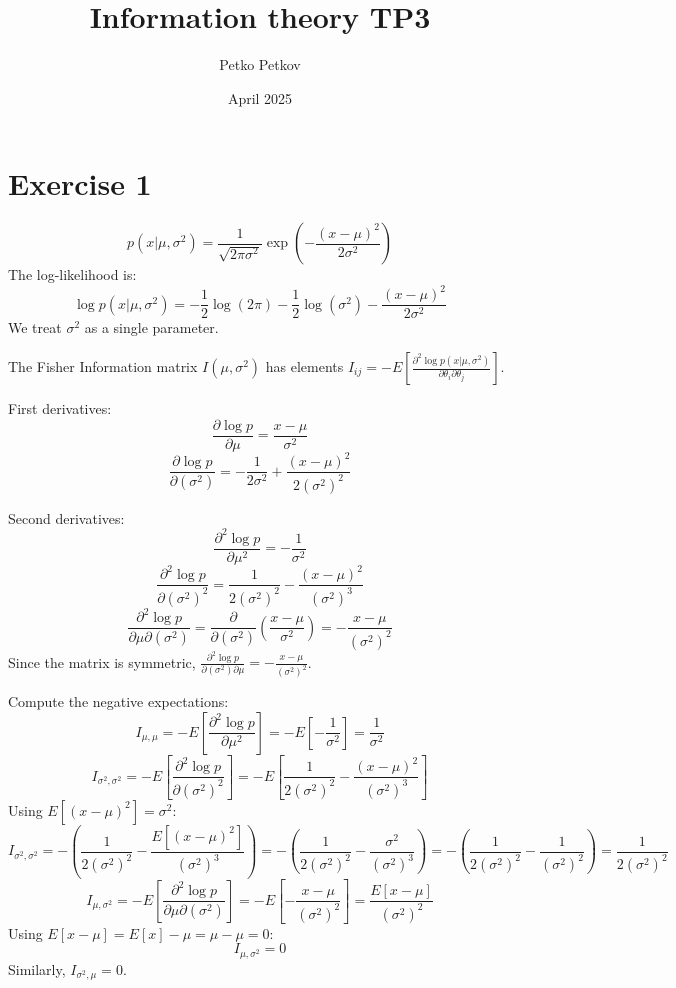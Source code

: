 \documentclass{article}
\title{Information theory TP3}
\author{Petko Petkov}
\begin{document}
\date{April 2025}
\maketitle

\section*{Exercise 1}

\[
p(x|\mu, \sigma^2) = \frac{1}{\sqrt{2\pi\sigma^2}} \exp\left(-\frac{(x-\mu)^2}{2\sigma^2}\right)
\]
The log-likelihood is:
\[
\log p(x|\mu, \sigma^2) = -\frac{1}{2} \log(2\pi) - \frac{1}{2} \log(\sigma^2) - \frac{(x-\mu)^2}{2\sigma^2}
\]
We treat $\sigma^2$ as a single parameter.

The Fisher Information matrix $I(\mu, \sigma^2)$ has elements $I_{ij} = -E\left[\frac{\partial^2 \log p(x|\mu, \sigma^2)}{\partial \theta_i \partial \theta_j}\right]$.

First derivatives:
\[
\frac{\partial \log p}{\partial \mu} = \frac{x-\mu}{\sigma^2}
\]
\[
\frac{\partial \log p}{\partial (\sigma^2)} = -\frac{1}{2\sigma^2} + \frac{(x-\mu)^2}{2(\sigma^2)^2}
\]

Second derivatives:
\[
\frac{\partial^2 \log p}{\partial \mu^2} = -\frac{1}{\sigma^2}
\]
\[
\frac{\partial^2 \log p}{\partial (\sigma^2)^2} = \frac{1}{2(\sigma^2)^2} - \frac{(x-\mu)^2}{(\sigma^2)^3}
\]
\[
\frac{\partial^2 \log p}{\partial \mu \partial (\sigma^2)} = \frac{\partial}{\partial (\sigma^2)} \left( \frac{x-\mu}{\sigma^2} \right) = -\frac{x-\mu}{(\sigma^2)^2}
\]
Since the matrix is symmetric, $\frac{\partial^2 \log p}{\partial (\sigma^2) \partial \mu} = -\frac{x-\mu}{(\sigma^2)^2}$.

Compute the negative expectations:
\[
I_{\mu, \mu} = -E\left[ \frac{\partial^2 \log p}{\partial \mu^2} \right] = -E\left[ -\frac{1}{\sigma^2} \right] = \frac{1}{\sigma^2}
\]
\[
I_{\sigma^2, \sigma^2} = -E\left[ \frac{\partial^2 \log p}{\partial (\sigma^2)^2} \right] = -E\left[ \frac{1}{2(\sigma^2)^2} - \frac{(x-\mu)^2}{(\sigma^2)^3} \right]
\]
Using $E[(x-\mu)^2] = \sigma^2$:
\[
I_{\sigma^2, \sigma^2} = -\left( \frac{1}{2(\sigma^2)^2} - \frac{E[(x-\mu)^2]}{(\sigma^2)^3} \right) = -\left( \frac{1}{2(\sigma^2)^2} - \frac{\sigma^2}{(\sigma^2)^3} \right) = -\left( \frac{1}{2(\sigma^2)^2} - \frac{1}{(\sigma^2)^2} \right) = \frac{1}{2(\sigma^2)^2}
\]
\[
I_{\mu, \sigma^2} = -E\left[ \frac{\partial^2 \log p}{\partial \mu \partial (\sigma^2)} \right] = -E\left[ -\frac{x-\mu}{(\sigma^2)^2} \right] = \frac{E[x-\mu]}{(\sigma^2)^2}
\]
Using $E[x-\mu] = E[x] - \mu = \mu - \mu = 0$:
\[
I_{\mu, \sigma^2} = 0
\]
Similarly, $I_{\sigma^2, \mu} = 0$.
\end{document}
